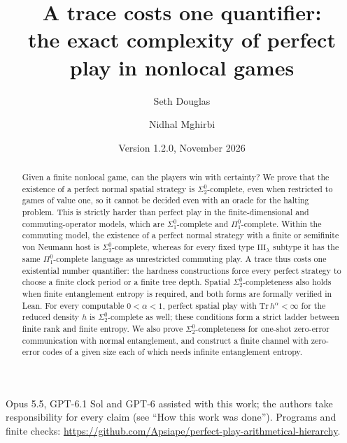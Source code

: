 \documentclass[11pt,a4paper]{article}
\title{A trace costs one quantifier:\\ the exact complexity of perfect play in nonlocal games}
\author{Seth Douglas \and Nidhal Mghirbi}
\date{Version 1.2.0, November 2026}
\theoremstyle{definition}
\theoremstyle{remark}
\newcommand{\codearchive}{\url{https://github.com/Apsiape/perfect-play-arithmetical-hierarchy}}
\begin{document}
\maketitle
\begin{abstract}
Given a finite nonlocal game, can the players win with certainty? We prove that the existence of a perfect normal spatial strategy is $\Sigma^0_2$-complete, even when restricted to games of value one, so it cannot be decided even with an oracle for the halting problem. This is strictly harder than perfect play in the finite-dimensional and commuting-operator models, which are $\Sigma^0_1$-complete and $\Pi^0_1$-complete. Within the commuting model, the existence of a perfect normal strategy with a finite or semifinite von Neumann host is $\Sigma^0_2$-complete, whereas for every fixed type $\mathrm{III}_\lambda$ subtype it has the same $\Pi^0_1$-complete language as unrestricted commuting play. A trace thus costs one existential number quantifier: the hardness constructions force every perfect strategy to choose a finite clock period or a finite tree depth. Spatial $\Sigma^0_2$-completeness also holds when finite entanglement entropy is required, and both forms are formally verified in Lean. For every computable $0<\alpha<1$, perfect spatial play with $\mathrm{Tr}\,h^\alpha<\infty$ for the reduced density $h$ is $\Sigma^0_2$-complete as well; these conditions form a strict ladder between finite rank and finite entropy. We also prove $\Sigma^0_2$-completeness for one-shot zero-error communication with normal entanglement, and construct a finite channel with zero-error codes of a given size each of which needs infinite entanglement entropy.
\end{abstract}
\begin{center}\small Opus 5.5, GPT-6.1 Sol and GPT-6 assisted with this work; the authors take responsibility for every claim (see ``How this work was done''). Programs and finite checks: \codearchive.\end{center}

{\small\tableofcontents}
\clearpage



















\appendix






\end{document}
